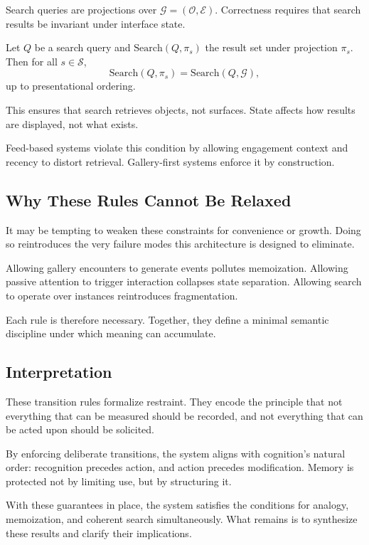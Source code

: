\documentclass[11pt,oneside]{article}
\begin{document}
Search queries are projections over $\mathcal{G} = (\mathcal{O}, \mathcal{E})$. Correctness requires that search results be invariant under interface state.

Let $Q$ be a search query and $\mathrm{Search}(Q, \pi_s)$ the result set under projection $\pi_s$. Then for all $s \in \mathcal{S}$,
\[
\mathrm{Search}(Q, \pi_s) = \mathrm{Search}(Q, \mathcal{G}),
\]
up to presentational ordering.

This ensures that search retrieves objects, not surfaces. State affects how results are displayed, not what exists.

Feed-based systems violate this condition by allowing engagement context and recency to distort retrieval. Gallery-first systems enforce it by construction.

\subsection{Why These Rules Cannot Be Relaxed}

It may be tempting to weaken these constraints for convenience or growth. Doing so reintroduces the very failure modes this architecture is designed to eliminate.

Allowing gallery encounters to generate events pollutes memoization. Allowing passive attention to trigger interaction collapses state separation. Allowing search to operate over instances reintroduces fragmentation.

Each rule is therefore necessary. Together, they define a minimal semantic discipline under which meaning can accumulate.

\subsection{Interpretation}

These transition rules formalize restraint. They encode the principle that not everything that can be measured should be recorded, and not everything that can be acted upon should be solicited.

By enforcing deliberate transitions, the system aligns with cognition’s natural order: recognition precedes action, and action precedes modification. Memory is protected not by limiting use, but by structuring it.

With these guarantees in place, the system satisfies the conditions for analogy, memoization, and coherent search simultaneously. What remains is to synthesize these results and clarify their implications.
\end{document}
